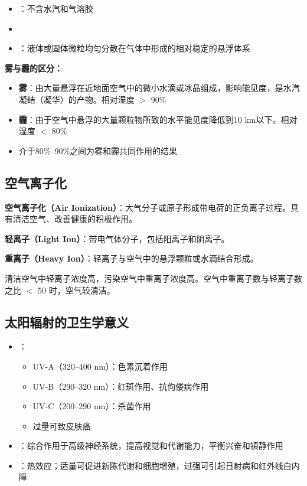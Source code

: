 \begin{itemize}[leftmargin=*]
    \item {}：不含水汽和气溶胶
    \item {}
    \item {}：液体或固体微粒均匀分散在气体中形成的相对稳定的悬浮体系
\end{itemize}

\begin{defbox}
\textbf{雾与霾的区分：}
\begin{itemize}[leftmargin=*]
    \item \textbf{雾}：由大量悬浮在近地面空气中的微小水滴或冰晶组成，影响能见度，是水汽凝结（凝华）的产物。相对湿度 $>$ 90\%
    \item \textbf{霾}：由于空气中悬浮的大量颗粒物所致的水平能见度降低到10 km以下。相对湿度 $<$ 80\%
    \item 介于80\%--90\%之间为雾和霾共同作用的结果
\end{itemize}
\end{defbox}

\subsection{空气离子化}

\begin{defbox}
\textbf{空气离子化（Air Ionization）}：大气分子或原子形成带电荷的正负离子过程。具有清洁空气、改善健康的积极作用。

\textbf{轻离子（Light Ion）}：带电气体分子，包括阳离子和阴离子。

\textbf{重离子（Heavy Ion）}：轻离子与空气中的悬浮颗粒或水滴结合形成。

清洁空气中轻离子浓度高，污染空气中重离子浓度高。空气中重离子数与轻离子数之比 $<$ 50 时，空气较清洁。
\end{defbox}

\subsection{太阳辐射的卫生学意义}
\begin{itemize}[leftmargin=*]
    \item {}：
    \begin{itemize}
        \item UV-A（320--400 nm）：色素沉着作用
        \item UV-B（290--320 nm）：红斑作用、抗佝偻病作用
        \item UV-C（200--290 nm）：杀菌作用
        \item 过量可致皮肤癌
    \end{itemize}
    \item {}：综合作用于高级神经系统，提高视觉和代谢能力，平衡兴奋和镇静作用
    \item {}：热效应；适量可促进新陈代谢和细胞增殖，过强可引起日射病和红外线白内障
\end{itemize}


